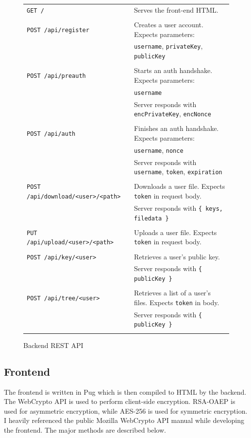 \documentclass{article}
\begin{document}
\noindent
\begin{figure}
    \centering
\begin{tabular}{l | l}
    \texttt{GET /} & Serves the front-end HTML. \\ \\
    \texttt{POST /api/register} & Creates a user account. Expects parameters: \\
    & \texttt{username}, \texttt{privateKey}, \texttt{publicKey} \\ \\
    \texttt{POST /api/preauth} & Starts an auth handshake. Expects parameters: \\
    & \texttt{username} \\
    & Server responds with \texttt{encPrivateKey}, \texttt{encNonce} \\ \\
    \texttt{POST /api/auth} & Finishes an auth handshake. Expects parameters: \\
    & \texttt{username}, \texttt{nonce} \\
    & Server responds with \texttt{username}, \texttt{token}, \texttt{expiration} \\ \\
    \small{\texttt{POST /api/download/<user>/<path>}} & Downloads a user file. Expects \texttt{token} in request body. \\
    & Server responds with \texttt{\{ keys, filedata \}} \\ \\
    \small{\texttt{PUT /api/upload/<user>/<path>}} & Uploads a user file. Expects \texttt{token} in request body. \\ \\
    \texttt{POST /api/key/<user>} & Retrieves a user's public key. \\
    & Server responds with \texttt{\{ publicKey \}} \\  \\
    \texttt{POST /api/tree/<user>} & Retrieves a list of a user's files. Expects \texttt{token} in body. \\
    & Server responds with \texttt{\{ publicKey \}} \\  \\
\end{tabular}
    \caption{Backend REST API}
    \label{fig:rest}
\end{figure}

\subsection{Frontend}
The frontend is written in Pug which is then compiled to HTML by the backend. The WebCrypto API\cite{w3c} is used to perform client-side encryption. RSA-OAEP\cite{rsa} is used for asymmetric encryption, while AES-256\cite{aes} is used for symmetric encryption. I heavily referenced the public Mozilla WebCrypto API manual\cite{moz} while developing the frontend. The major methods are described below.
\end{document}
